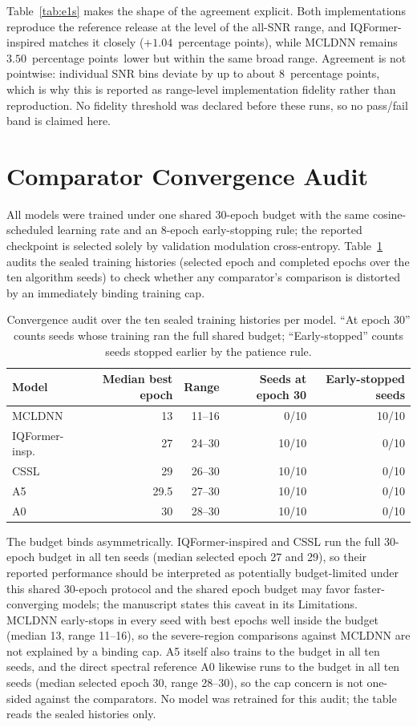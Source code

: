 \documentclass[letterpaper,onecolumn,11pt,journal]{IEEEtran}
\newcommand{\pp}{percentage points}
\begin{document}
Table~\ref{tab:e1s} makes the shape of the agreement explicit. Both
implementations reproduce the reference release at the level of the all-SNR
range, and IQFormer-inspired matches it closely ($+1.04$~\pp), while MCLDNN
remains $3.50$~\pp\ lower but within the same broad range. Agreement is not
pointwise: individual SNR bins deviate by up to about $8$~\pp, which is why
this is reported as range-level implementation fidelity rather than
reproduction. No fidelity threshold was declared before these runs, so no
pass/fail band is claimed here.

\section{Comparator Convergence Audit}
All models were trained under one shared 30-epoch budget with the same
cosine-scheduled learning rate and an 8-epoch early-stopping rule; the
reported checkpoint is selected solely by validation modulation
cross-entropy. Table~\ref{tab:convergence} audits the sealed training
histories (selected epoch and completed epochs over the ten algorithm seeds)
to check whether any comparator's comparison is distorted by an immediately
binding training cap.

\begin{table}[t]
\centering
\caption{Convergence audit over the ten sealed training histories per model.
``At epoch 30'' counts seeds whose training ran the full shared budget;
``Early-stopped'' counts seeds stopped earlier by the patience rule.}
\label{tab:convergence}
\footnotesize
\setlength{\tabcolsep}{5pt}
\begin{tabular}{lrrrr}
\toprule
Model & Median best epoch & Range & Seeds at epoch 30 & Early-stopped seeds\\
\midrule
MCLDNN & 13 & 11--16 & 0/10 & 10/10\\
IQFormer-insp. & 27 & 24--30 & 10/10 & 0/10\\
CSSL & 29 & 26--30 & 10/10 & 0/10\\
A5 & 29.5 & 27--30 & 10/10 & 0/10\\
A0 & 30 & 28--30 & 10/10 & 0/10\\
\bottomrule
\end{tabular}
\end{table}

The budget binds asymmetrically. IQFormer-inspired and CSSL run the full
30-epoch budget in all ten seeds (median selected epoch 27 and 29), so their
reported performance should be interpreted as potentially budget-limited under
this shared 30-epoch protocol and the shared epoch budget may favor
faster-converging
models; the manuscript states this caveat in its Limitations. MCLDNN
early-stops in every seed with best epochs well inside the budget (median 13,
range 11--16), so the severe-region comparisons against MCLDNN are not
explained by a binding cap. A5 itself also trains to the budget in all ten
seeds, and the direct spectral reference A0 likewise runs to the budget in
all ten seeds (median selected epoch 30, range 28--30), so the cap concern
is not one-sided against the comparators. No model
was retrained for this audit; the table reads the sealed histories only.
\end{document}
